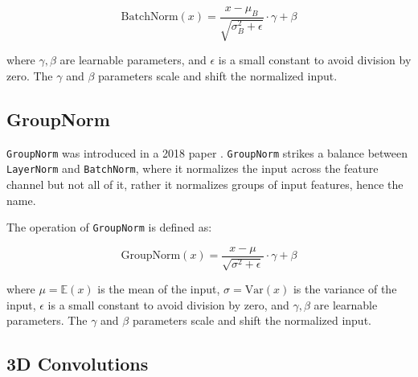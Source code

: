 \begin{equation*}
    \text{BatchNorm}(x) = \frac{x - \mu_B}{\sqrt{\sigma^2_B + \epsilon}} \cdot \gamma + \beta
\end{equation*}

where $\gamma, \beta$ are learnable parameters, and $\epsilon$ is a small constant to avoid division by zero. The $\gamma$ and $\beta$ parameters scale and shift the normalized input.








\subsection*{GroupNorm}

\texttt{GroupNorm} was introduced in a 2018 paper \cite{wu2018group}. \texttt{GroupNorm} strikes a balance between \texttt{LayerNorm} and \texttt{BatchNorm}, where it normalizes the input across the feature channel but not all of it, rather it normalizes groups of input features, hence the name.

The operation of \texttt{GroupNorm} is defined as:

\begin{equation*}
    \text{GroupNorm}(x) = \frac{x - \mu}{\sqrt{\sigma^2 + \epsilon}} \cdot \gamma + \beta
\end{equation*}

where $\mu = \mathbb{E}(x)$ is the mean of the input, $\sigma = \text{Var} (x)$ is the variance of the input, $\epsilon$ is a small constant to avoid division by zero, and $\gamma, \beta$ are learnable parameters. The $\gamma$ and $\beta$ parameters scale and shift the normalized input.











\subsection{3D Convolutions}
\label{appendix:blocks_3dconv}

